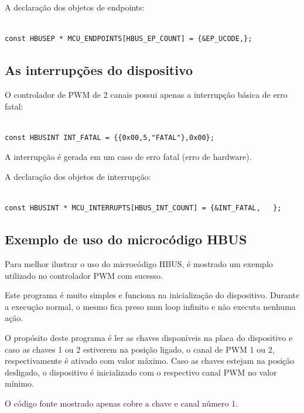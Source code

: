 A declaração dos objetos de endpoints:

\begin{verbatim}

const HBUSEP * MCU_ENDPOINTS[HBUS_EP_COUNT] = {&EP_UCODE,};

\end{verbatim}

\subsection{As interrupções do dispositivo}

O controlador de PWM de 2 canais possui apenas a interrupção básica de erro fatal:

\begin{verbatim}

const HBUSINT INT_FATAL = {{0x00,5,"FATAL"},0x00};

\end{verbatim}

A interrupção é gerada em um caso de erro fatal (erro de hardware).

A declaração dos objetos de interrupção:

\begin{verbatim}

const HBUSINT * MCU_INTERRUPTS[HBUS_INT_COUNT] = {&INT_FATAL,	};

\end{verbatim}

\subsection{Exemplo de uso do microcódigo HBUS}

Para melhor ilustrar o uso do microcódigo HBUS, é mostrado um exemplo utilizado no controlador PWM com sucesso.

Este programa é muito simples e funciona na inicialização do dispositivo. Durante a execução normal, o mesmo fica preso num loop infinito e não executa nenhuma ação.

O propósito deste programa é ler as chaves disponíveis na placa do dispositivo e caso as chaves 1 ou 2 estiverem na posição ligado, o canal de PWM 1 ou 2, respectivamente é ativado com valor máximo. Caso as chaves estejam na posição desligado, o dispositivo é inicializado com o respectivo canal PWM no valor mínimo.

O código fonte mostrado apenas cobre a chave e canal número 1.


